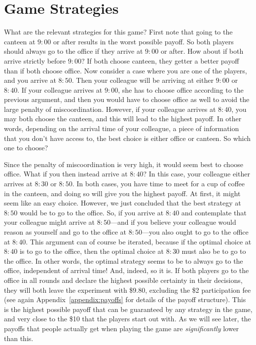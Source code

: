 \section{Game Strategies}
What are the relevant strategies for this game? First note that going to the canteen at $9{:}00$ or after results in the worst possible payoff. So both players should always go to the office if they arrive at $9{:}00$ or after. How about if both arrive strictly before $9{:}00$? If both choose canteen, they getter a better payoff than if both choose office. Now consider a case where you are one of the players, and you arrive at $8{:}50$. Then your colleague will be arriving at either $9{:}00$ or $8{:}40$. If your colleague arrives at $9{:}00$, she has to choose office according to the previous argument, and then you would have to choose office as well to avoid the large penalty of miscoordination. However, if your colleague arrives at $8{:}40$, you may both choose the canteen, and this will lead to the highest payoff. In other words, depending on the arrival time of your colleague, a piece of information that you don't have access to, the best choice is either office or canteen. So which one to choose?

Since the penalty of miscoordination is very high, it would seem best to choose office. What if you then instead  arrive at $8{:}40$? In this case, your colleague either arrives at $8{:}30$ or $8{:}50$. In both cases, you have time to meet for a cup of coffee in the canteen, and doing so will give you the highest payoff. At first, it might seem like an easy choice. However, we just concluded that the best strategy at $8{:}50$ would be to go to the office. So, if you arrive at $8{:}40$ and contemplate that your colleague might arrive at $8{:}50$---and if you believe your colleague would reason as yourself and go to the office at $8{:}50$---you also ought to go to the office at $8{:}40$. This argument can of course be iterated, because if the optimal choice at $8{:}40$ is to go to the office, then the optimal choice at $8{:}30$ must also be to go to the office. In other words, the optimal strategy seems to be to always go to the office, independent of arrival time! And, indeed, so it is. If both players go to the office in all rounds and declare the highest possible certainty in their decisions, they will both leave the experiment with \$9.80, excluding the \$2 participation fee (see again Appendix~\ref{appendix:payoffs} for details of the payoff structure). This is the highest possible payoff that can be guaranteed by any strategy in the game, and very close to the \$10 that the players start out with. As we will see later, the payoffs that people actually get when playing the game are \emph{significantly} lower than this.


